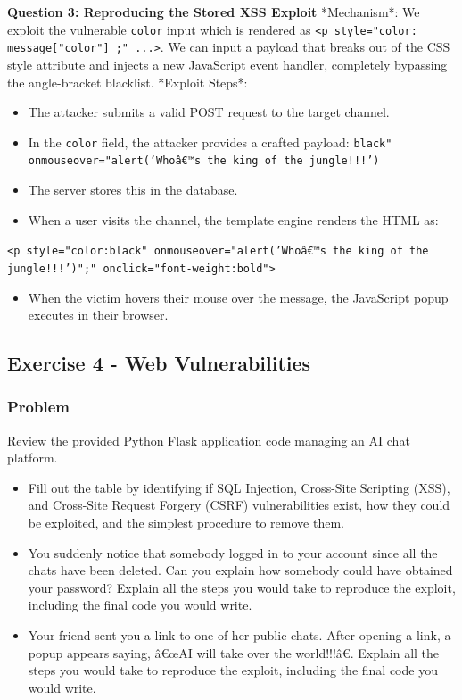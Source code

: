 \documentclass{article}
\begin{document}
\textbf{Question 3: Reproducing the Stored XSS Exploit}
*Mechanism*: We exploit the vulnerable \texttt{color} input which is rendered as \texttt{<p style="color:{{ message["color"] }};" ...>}. We can input a payload that breaks out of the CSS style attribute and injects a new JavaScript event handler, completely bypassing the angle-bracket blacklist.
*Exploit Steps*:
\begin{itemize}
    \item[\textbf{1.}] The attacker submits a valid POST request to the target channel.
    \item[\textbf{2.}] In the \texttt{color} field, the attacker provides a crafted payload: \texttt{black" onmouseover="alert('Whoâ€™s the king of the jungle!!!')}
    \item[\textbf{3.}] The server stores this in the database.
    \item[\textbf{4.}] When a user visits the channel, the template engine renders the HTML as:
\end{itemize}
\texttt{<p style="color:black" onmouseover="alert('Whoâ€™s the king of the jungle!!!')";" onclick="font-weight:bold">}
\begin{itemize}
    \item[\textbf{5.}] When the victim hovers their mouse over the message, the JavaScript popup executes in their browser.
\end{itemize}

\subsection{Exercise 4 - Web Vulnerabilities}
\subsubsection*{Problem}
Review the provided Python Flask application code managing an AI chat platform.

\begin{itemize}
    \item[\textbf{1.}] Fill out the table by identifying if SQL Injection, Cross-Site Scripting (XSS), and Cross-Site Request Forgery (CSRF) vulnerabilities exist, how they could be exploited, and the simplest procedure to remove them.
    \item[\textbf{2.}] You suddenly notice that somebody logged in to your account since all the chats have been deleted. Can you explain how somebody could have obtained your password? Explain all the steps you would take to reproduce the exploit, including the final code you would write.
    \item[\textbf{3.}] Your friend sent you a link to one of her public chats. After opening a link, a popup appears saying, â€œAI will take over the world!!!â€. Explain all the steps you would take to reproduce the exploit, including the final code you would write.
\end{itemize}
\end{document}
